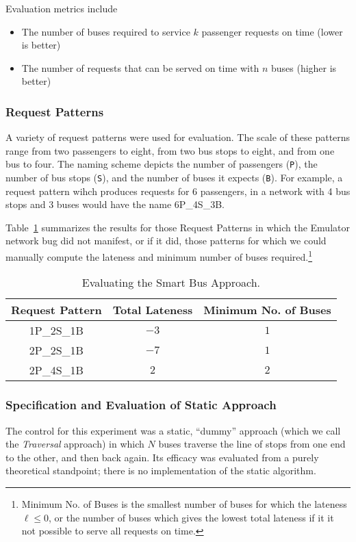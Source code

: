 \documentclass[runningheads]{llncs}
\begin{document}
Evaluation metrics include
\begin{itemize}
	\item The number of buses required to service $k$ passenger requests on time (lower is better)
	\item The number of requests that can be served on time with $n$ buses (higher is better)
\end{itemize}

\subsubsection{Request Patterns}
A variety of request patterns were used for evaluation. The scale of these patterns range from two passengers to eight, from two bus stops to eight, and from one bus to four. The naming scheme depicts the number of passengers (\lstinline{P}), the number of bus stops (\lstinline{S}), and the number of buses it expects (\lstinline{B}). For example, a request pattern wihch produces requests for 6 passengers, in a network with 4 bus stops and 3 buses would have the name 6P\_4S\_3B.

Table~\ref{tbl:smart-bus} summarizes the results for those Request Patterns in which the Emulator network bug did not manifest, or if it did, those patterns for which we could manually compute the lateness and minimum number of buses required.\footnote{Minimum No. of Buses is the smallest number of buses for which the lateness $\ell \leq 0$, or the number of buses which gives the lowest total lateness if it it not possible to serve all requests on time.}

\setlength{\tabcolsep}{1em}
\begin{table}[htbp]
\centering
\caption{Evaluating the Smart Bus Approach.}
\begin{tabular}{c c c}
Request Pattern & Total Lateness & Minimum No. of Buses \\ \hline
1P\_2S\_1B & $-3$ & $1$ \\
2P\_2S\_1B & $-7$ & $1$ \\
2P\_4S\_1B & $2$  & $2$ \\
\end{tabular}
\label{tbl:smart-bus}
\end{table}

\subsubsection{Specification and Evaluation of Static Approach}
The control for this experiment was a static, ``dummy'' approach (which we call the \emph{Traversal} approach) in which $N$ buses traverse the line of stops from one end to the other, and then back again. Its efficacy was evaluated from a purely theoretical standpoint; there is no implementation of the static algorithm.
\end{document}
